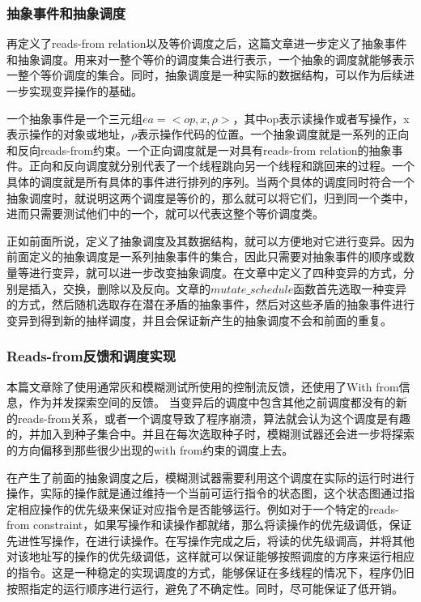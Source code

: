 \subsubsection{抽象事件和抽象调度}

再定义了reads-from relation以及等价调度之后，这篇文章进一步定义了抽象事件和抽象调度。用来对一整个等价的调度集合进行表示，一个抽象的调度就能够表示一整个等价调度的集合。同时，抽象调度是一种实际的数据结构，可以作为后续进一步实现变异操作的基础。

一个抽象事件是一个三元组$ea=<op, x, \rho>$，其中op表示读操作或者写操作，x表示操作的对象或地址，$\rho$表示操作代码的位置。一个抽象调度就是一系列的正向和反向reads-from约束。一个正向调度就是一对具有reads-from relation的抽象事件。正向和反向调度就分别代表了一个线程跳向另一个线程和跳回来的过程。一个具体的调度就是所有具体的事件进行排列的序列。当两个具体的调度同时符合一个抽象调度时，就说明这两个调度是等价的，那么就可以将它们，归到同一个类中，进而只需要测试他们中的一个，就可以代表这整个等价调度类。

正如前面所说，定义了抽象调度及其数据结构，就可以方便地对它进行变异。因为前面定义的抽象调度是一系列抽象事件的集合，因此只需要对抽象事件的顺序或数量等进行变异，就可以进一步改变抽象调度。在文章中定义了四种变异的方式，分别是插入，交换，删除以及反向。文章的$mutate\_schedule$函数首先选取一种变异的方式，然后随机选取存在潜在矛盾的抽象事件，然后对这些矛盾的抽象事件进行变异到得到新的抽样调度，并且会保证新产生的抽象调度不会和前面的重复。

\subsubsection{Reads-from反馈和调度实现}

本篇文章除了使用通常灰和模糊测试所使用的控制流反馈，还使用了With from信息，作为并发探索空间的反馈。 当变异后的调度中包含其他之前调度都没有的新的reads-from关系，或者一个调度导致了程序崩溃，算法就会认为这个调度是有趣的，并加入到种子集合中。并且在每次选取种子时，模糊测试器还会进一步将探索的方向偏移到那些很少出现的with from约束的调度上去。

在产生了前面的抽象调度之后，模糊测试器需要利用这个调度在实际的运行时进行操作，实际的操作就是通过维持一个当前可运行指令的状态图，这个状态图通过指定相应操作的优先级来保证对应指令是否能够运行。例如对于一个特定的reads-from constraint，如果写操作和读操作都就绪，那么将读操作的优先级调低，保证先进性写操作，在进行读操作。在写操作完成之后，将读的优先级调高，并将其他对该地址写的操作的优先级调低，这样就可以保证能够按照调度的方序来运行相应的指令。这是一种稳定的实现调度的方式，能够保证在多线程的情况下，程序仍旧按照指定的运行顺序进行运行，避免了不确定性。同时，尽可能保证了低开销。

